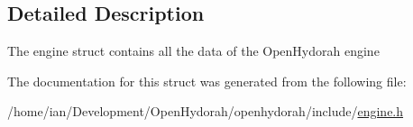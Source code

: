 \subsection{Detailed Description}
The engine struct contains all the data of the Open\-Hydorah engine 

The documentation for this struct was generated from the following file\-:\begin{DoxyCompactItemize}
\item 
/home/ian/\-Development/\-Open\-Hydorah/openhydorah/include/\hyperlink{engine_8h}{engine.\-h}\end{DoxyCompactItemize}
